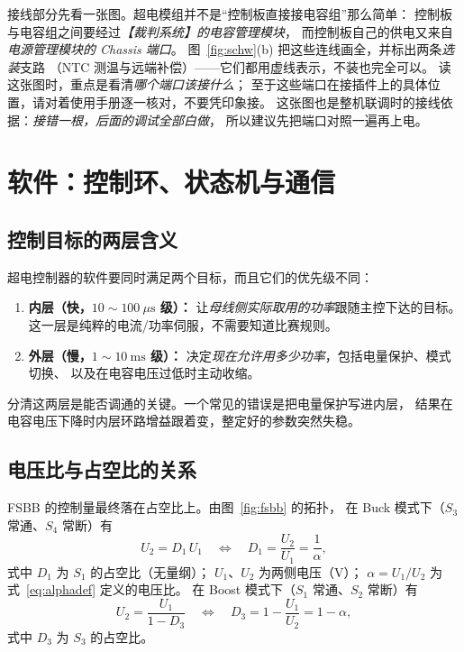 \documentclass[cn,blue,11pt,device=normal]{elegantnote}
\newcommand{\fref}[1]{式~\eqref{#1}}
\begin{document}
接线部分先看一张图。超电模组并不是“控制板直接接电容组”那么简单：
控制板与电容组之间要经过\emph{【裁判系统】的电容管理模块}，
而控制板自己的供电又来自\emph{电源管理模块的 Chassis 端口}。
图~\ref{fig:schw}(b) 把这些连线画全，并标出两条\emph{选装}支路
（NTC 测温与远端补偿）——它们都用虚线表示，不装也完全可以。
读这张图时，重点是看清\emph{哪个端口该接什么}；
至于这些端口在接插件上的具体位置，请对着使用手册逐一核对，不要凭印象接。
这张图也是整机联调时的接线依据：\emph{接错一根，后面的调试全部白做}，
所以建议先把端口对照一遍再上电。








\FloatBarrier

\section{软件：控制环、状态机与通信}\label{sec:scsw}

\subsection{控制目标的两层含义}

超电控制器的软件要同时满足两个目标，而且它们的优先级不同：

\begin{enumerate}
  \item \textbf{内层（快，$10\sim100\ \mu\mathrm{s}$ 级）：}
  让\emph{母线侧实际取用的功率}跟随主控下达的目标。
  这一层是纯粹的电流/功率伺服，不需要知道比赛规则。
  \item \textbf{外层（慢，$1\sim10\ \mathrm{ms}$ 级）：}
  决定\emph{现在允许用多少功率}，包括电量保护、模式切换、
  以及在电容电压过低时主动收缩。
\end{enumerate}

分清这两层是能否调通的关键。一个常见的错误是把电量保护写进内层，
结果在电容电压下降时内层环路增益跟着变，整定好的参数突然失稳。

\subsection{电压比与占空比的关系}

FSBB 的控制量最终落在占空比上。由图~\ref{fig:fsbb} 的拓扑，
在 Buck 模式下（$S_3$ 常通、$S_4$ 常断）有
\begin{equation}\label{eq:d1}
  U_2 = D_1\,U_1 \quad\Longleftrightarrow\quad D_1 = \frac{U_2}{U_1} = \frac{1}{\alpha},
\end{equation}
式中 $D_1$ 为 $S_1$ 的占空比（无量纲）；
$U_1$、$U_2$ 为两侧电压（V）；
$\alpha=U_1/U_2$ 为 \fref{eq:alphadef} 定义的电压比。
在 Boost 模式下（$S_1$ 常通、$S_2$ 常断）有
\begin{equation}\label{eq:d3}
  U_2 = \frac{U_1}{1-D_3} \quad\Longleftrightarrow\quad D_3 = 1-\frac{U_1}{U_2} = 1-\alpha ,
\end{equation}
式中 $D_3$ 为 $S_3$ 的占空比。
\end{document}

